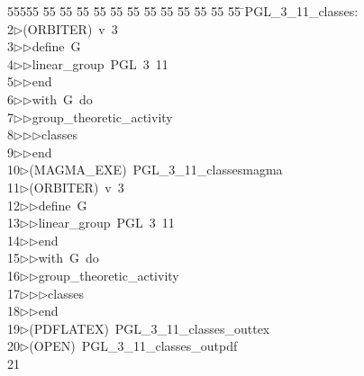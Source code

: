 %
%
\begin{tabbing}
55555 \= 55 \= 55 \= 55 \= 55 \= 55 \= 55 \= 55 \= 55 \= 55 \= 55 \= 55 \= 55 \= \>PGL\_3\_11\_classes:\\[0pt]
2\>$\triangleright$\>(ORBITER)\ v\ 3\ \\[0pt]
3\>$\triangleright$\>$\triangleright$\>define\ G\ \\[0pt]
4\>$\triangleright$\>$\triangleright$\>linear\_group\ PGL\ 3\ 11\ \\[0pt]
5\>$\triangleright$\>$\triangleright$\>end\ \\[0pt]
6\>$\triangleright$\>$\triangleright$\>with\ G\ do\ \\[0pt]
7\>$\triangleright$\>$\triangleright$\>group\_theoretic\_activity\ \\[0pt]
8\>$\triangleright$\>$\triangleright$\>$\triangleright$\>classes\ \\[0pt]
9\>$\triangleright$\>$\triangleright$\>end\\[0pt]
10\>$\triangleright$\>(MAGMA\_EXE)\ PGL\_3\_11\_classesmagma\\[0pt]
11\>$\triangleright$\>(ORBITER)\ v\ 3\ \\[0pt]
12\>$\triangleright$\>$\triangleright$\>define\ G\ \\[0pt]
13\>$\triangleright$\>$\triangleright$\>linear\_group\ PGL\ 3\ 11\ \\[0pt]
14\>$\triangleright$\>$\triangleright$\>end\ \\[0pt]
15\>$\triangleright$\>$\triangleright$\>with\ G\ do\ \\[0pt]
16\>$\triangleright$\>$\triangleright$\>group\_theoretic\_activity\ \\[0pt]
17\>$\triangleright$\>$\triangleright$\>$\triangleright$\>classes\ \\[0pt]
18\>$\triangleright$\>$\triangleright$\>end\\[0pt]
19\>$\triangleright$\>(PDFLATEX)\ PGL\_3\_11\_classes\_outtex\\[0pt]
20\>$\triangleright$\>(OPEN)\ PGL\_3\_11\_classes\_outpdf\\[0pt]
21\>\end{tabbing}
